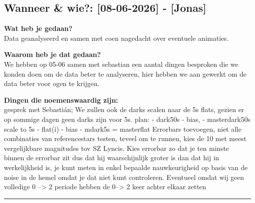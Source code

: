 
\subsection*{Wanneer \& wie?: [08-06-2026] - [Jonas]}

\textbf{Wat heb je gedaan?}\\
Data geanalyseerd en samen met coen nagedacht over eventuele animaties.
\vspace{0.3cm} 

\noindent \textbf{Waarom heb je dat gedaan?}\\
We hebben op 05-06 samen met sebastian een aantal dingen besproken die we konden doen om de data beter te analyseren, hier hebben we aan gewerkt om de data beter voor ogen te krijgen.

\noindent \textbf{Dingen die noemenswaardig zijn:}\\
gesprek met Sebastián; We zullen ook de darks scalen naar de 5s flats, gezien er op sommige dagen geen darks zijn voor 5s. 
plan: 
- dark50s - bias,
- masterdark50s scale to 5s
- flat(i) - bias - mdark5s = masterflat
Errorbars toevoegen, niet alle combinaties van referencestars testen, teveel om te runnen, kies de 10 met meest vergelijkbare magnitudes tov SZ Lyncis. Kies errorbar zo dat je ten minste binnen de errorbar zit dus dat hij waarschijnlijk groter is dan dat hij in werkelijkheid is, je kunt meten in enkel bepaalde nauwkeurigheid op basis van de noise in de hemel omdat je dat niet kunt controleren. Eventueel omdat wij geen volledige 0 --> 2 periode hebben de 0--> 2 keer achter elkaar zetten



\vspace{0.5cm}
\hrule 
\vspace{0.5cm}
